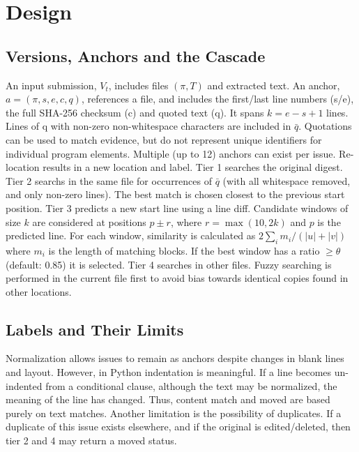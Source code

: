 \documentclass[10pt,conference,letterpaper]{IEEEtran}
\begin{document}
\section{Design}


\subsection{Versions, Anchors and the Cascade}


An input submission, $V_t$, includes files $(\pi,T)$ and extracted text. An anchor, $a=(\pi,s,e,c,q)$, references a file, and includes the first/last line numbers (s/e), the full SHA-256 checksum (c) and quoted text (q). It spans $k=e-s+1$ lines. Lines of q with non-zero non-whitespace characters are included in $\bar q$. Quotations can be used to match evidence, but do not represent unique identifiers for individual program elements. Multiple (up to 12) anchors can exist per issue. Re-location results in a new location and label. Tier 1 searches the original digest. Tier 2 searchs in the same file for occurrences of $\bar q$ (with all whitespace removed, and only non-zero lines). The best match is chosen closest to the previous start position. Tier 3 predicts a new start line using a line diff. Candidate windows of size $k$ are considered at positions $p\pm r$, where $r=\max(10,2k)$ and $p$ is the predicted line. For each window, similarity is calculated as $2\sum_i m_i/(|u|+|v|)$ where $m_i$ is the length of matching blocks. If the best window has a ratio $\geq\theta$ (default: 0.85) it is selected. Tier 4 searches in other files. Fuzzy searching is performed in the current file first to avoid bias towards identical copies found in other locations.





\subsection{Labels and Their Limits}


Normalization allows issues to remain as anchors despite changes in blank lines and layout. However, in Python indentation is meaningful. If a line becomes un-indented from a conditional clause, although the text may be normalized, the meaning of the line has changed. Thus, content match and moved are based purely on text matches. Another limitation is the possibility of duplicates. If a duplicate of this issue exists elsewhere, and if the original is edited/deleted, then tier 2 and 4 may return a moved status.
\end{document}
